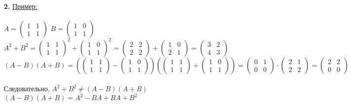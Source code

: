 \documentclass[a4paper]{article}
\newcommand{\mat}[1]{\begin{pmatrix} #1 \end{pmatrix}}
\newcommand{\dspace}{\space\space}
\begin{document}
\begin{enumerate}
    \item[\textbf{2.}] \underline{Пример:} \\\\ 
    $A = \mat{1 & 1 \\ 1 & 1}$ \dspace $B = \mat{1 & 0 \\ 1 & 1}$\\
    $A^2 + B^2 = \mat{1 & 1 \\ 1 & 1}^2+\mat{1 & 0 \\ 1 & 1}^2 = \mat{2 & 2 \\ 2 & 2} + \mat{1 & 0 \\ 2 & 1} = \mat{3 & 2 \\ 4 & 3}$ \\
    $(A-B)(A+B) = (\mat{1 & 1 \\ 1 & 1} - \mat{1 & 0 \\ 1 & 1})(\mat{1 & 1 \\ 1 & 1}+\mat{1 & 0 \\ 1 & 1}) = \mat{0 & 1 \\ 0 & 0} \cdot \mat{2 & 1 \\ 2 & 2} = \mat{2 & 2 \\ 0 & 0}$\\\\
    Следовательно, $A^2 + B^2 \neq (A-B)(A+B)$\\
    $(A-B)(A+B) = A^2-BA+BA + B^2$ \\


\end{enumerate}
\end{document}

